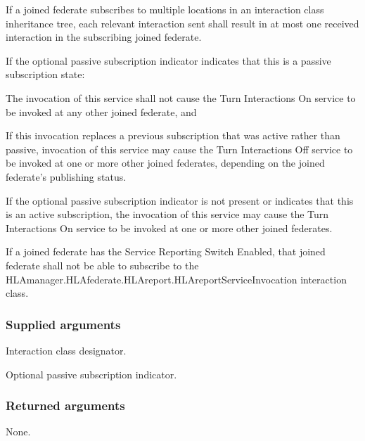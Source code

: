 \begin{compactstdpage}
    If a joined federate subscribes to multiple locations in an interaction class inheritance tree, each relevant interaction sent shall result in at most one received interaction in the subscribing joined federate.

    If the optional passive subscription indicator indicates that this is a passive subscription state:

    \begin{stdalphalist}
        \item The invocation of this service shall not cause the Turn Interactions On \rtiinitiated{} service to be invoked at any other joined federate, and
        \item If this invocation replaces a previous subscription that was active rather than passive, invocation of this service may cause the Turn Interactions Off \rtiinitiated{} service to be invoked at one or more other joined federates, depending on the joined federate's publishing status.
    \end{stdalphalist}

    If the optional passive subscription indicator is not present or indicates that this is an active subscription, the invocation of this service may cause the Turn Interactions On \rtiinitiated{} service to be invoked at one or more other joined federates.

    If a joined federate has the Service Reporting Switch Enabled, that joined federate shall not be able to subscribe to the HLAmanager.\allowbreak HLAfederate.\allowbreak HLAreport.\allowbreak HLAreportServiceInvocation interaction class.

    \subsubsection{Supplied arguments}
    \begin{stdalphalist}
        \item Interaction class designator.\item Optional passive subscription indicator.
    \end{stdalphalist}

    \subsubsection{Returned arguments}
    \begin{stdalphalist}
        \item None.
    \end{stdalphalist}


\end{compactstdpage}
